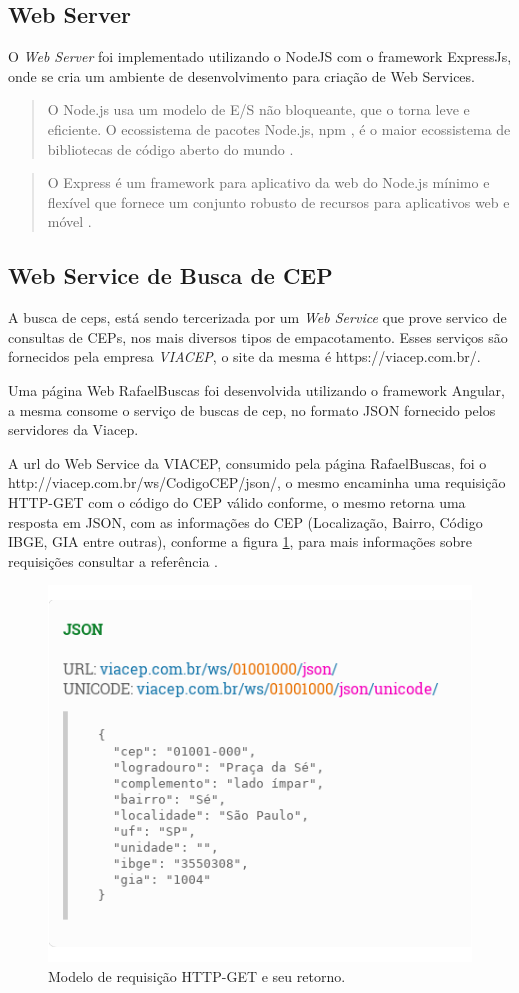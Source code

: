 \documentclass[12pt]{article}
\begin{document}
\subsection{Web Server}
	O \textit{Web Server} foi implementado utilizando o NodeJS com o framework ExpressJs, onde se cria um ambiente de desenvolvimento para criação de Web Services.
	\begin{quote}
	O Node.js usa um modelo de E/S não bloqueante, que o torna leve e eficiente. O ecossistema de pacotes Node.js, npm , é o maior ecossistema de bibliotecas de código aberto do mundo \cite{nodejs}.
	\end{quote}
	\begin{quote}
	O Express é um framework para aplicativo da web do Node.js mínimo e flexível que fornece um conjunto robusto de recursos para aplicativos web e móvel \cite{expressjs}.
	\end{quote}

\subsection{Web Service de Busca de CEP}
	A busca de ceps, está sendo tercerizada por um \textit{Web Service} que prove  servico de consultas de CEPs, nos mais diversos tipos de empacotamento. Esses serviços são fornecidos pela empresa	\textit{VIACEP}, o site da mesma é https://viacep.com.br/.

	Uma página Web RafaelBuscas foi desenvolvida utilizando o framework Angular, a mesma consome o serviço de buscas de cep, no formato JSON fornecido pelos servidores da Viacep.
	
	A url do Web Service da VIACEP, consumido pela página RafaelBuscas, foi o http://viacep.com.br/ws/CodigoCEP/json/, o mesmo encaminha uma requisição HTTP-GET com o código do CEP válido conforme, o mesmo retorna uma resposta em JSON, com as informações do CEP (Localização, Bairro, Código IBGE, GIA entre outras), conforme a figura \ref{c33}, para mais informações sobre requisições consultar a referência \cite{viacep}. 
	 \begin{figure}[H]
		\centering
		\includegraphics[scale=0.6]{Imagens/via.png}
		\caption{Modelo de requisição HTTP-GET e seu retorno.}
		\label{c33}
	\end{figure}
\end{document}
